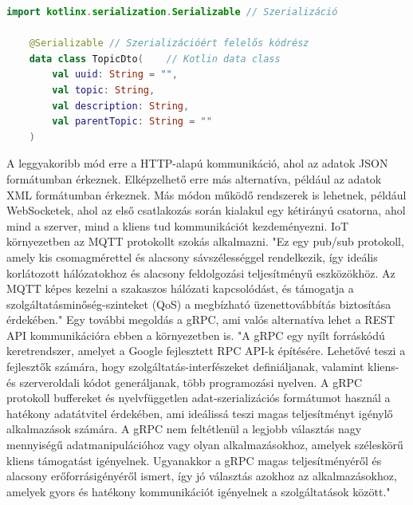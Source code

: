 \begin{lstlisting}[caption={Egy DTO struktúrája. Szerializáció: \refstruc{sec:KotlinX}}, label={lst:Model}, language=Kotlin]
    import kotlinx.serialization.Serializable // Szerializáció

    @Serializable // Szerializációért felelős kódrész
    data class TopicDto(    // Kotlin data class
        val uuid: String = "",
        val topic: String,
        val description: String,
        val parentTopic: String = ""
    )
\end{lstlisting}

A leggyakoribb mód erre a HTTP-alapú kommunikáció, ahol az adatok JSON formátumban érkeznek.  
Elképzelhető erre más alternatíva, például az adatok XML formátumban érkeznek.  
Más módon működő rendszerek is lehetnek, például WebSocketek, ahol az első csatlakozás során kialakul egy kétirányú csatorna, ahol mind a szerver, mind a kliens tud kommunikációt kezdeményezni.  
IoT környezetben az MQTT protokollt szokás alkalmazni. "Ez egy pub/sub protokoll, amely kis csomagmérettel és alacsony sávszélességgel rendelkezik, így ideális korlátozott hálózatokhoz és alacsony feldolgozási teljesítményű eszközökhöz. Az MQTT képes kezelni a szakaszos hálózati kapcsolódást, és támogatja a szolgáltatásminőség-szinteket (QoS) a megbízható üzenettovábbítás biztosítása érdekében." \cite{RESTAPIAlternatives}  
Egy további megoldás a gRPC, ami valós alternatíva lehet a REST API kommunikációra ebben a környezetben is. "A gRPC egy nyílt forráskódú keretrendszer, amelyet a Google fejlesztett RPC API-k építésére. Lehetővé teszi a fejlesztők számára, hogy szolgáltatás-interfészeket definiáljanak, valamint kliens- és szerveroldali kódot generáljanak, több programozási nyelven. A gRPC protokoll buffereket és nyelvfüggetlen adat-szerializációs formátumot használ a hatékony adatátvitel érdekében, ami ideálissá teszi magas teljesítményt igénylő alkalmazások számára. A gRPC nem feltétlenül a legjobb választás nagy mennyiségű adatmanipulációhoz vagy olyan alkalmazásokhoz, amelyek széleskörű kliens támogatást igényelnek. Ugyanakkor a gRPC magas teljesítményéről és alacsony erőforrásigényéről ismert, így jó választás azokhoz az alkalmazásokhoz, amelyek gyors és hatékony kommunikációt igényelnek a szolgáltatások között." \cite{RESTAPIAlternatives}

